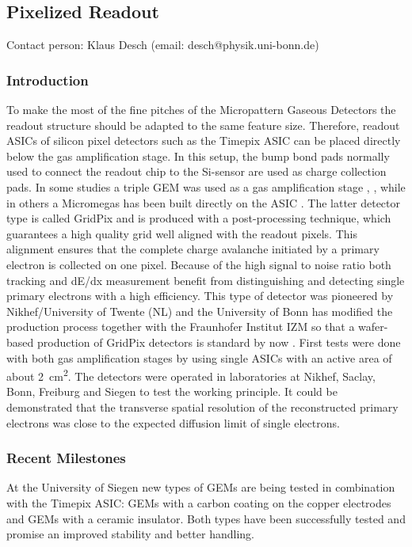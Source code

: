 \subsection{Pixelized Readout}\label{chap:TPC_sec:pixels}
Contact person: Klaus Desch (email: desch@physik.uni-bonn.de)\\

\subsubsection{Introduction}
To make the most of the fine pitches of the Micropattern Gaseous Detectors the
readout structure should be adapted to the same feature size. Therefore,
readout ASICs of silicon pixel detectors such as the Timepix ASIC
\cite{TPC_pixel_Timepix} can be placed directly below the gas amplification
stage. In this setup, the bump bond pads normally used to connect the readout
chip to the Si-sensor are used as charge collection pads. In some studies a
triple GEM was used as a gas amplification stage \cite{TPC_pixel_GEM_TP_1},
\cite{TPC_pixel_GEM_TP_2}, while in others a Micromegas has been built
directly on the ASIC \cite{TPC_pixel_InGrid}. The latter detector type is
 called GridPix and is produced with a post-processing technique, which
 guarantees a high quality grid well aligned with the readout pixels. This
 alignment ensures that the complete charge avalanche initiated by a primary
 electron is collected on one pixel. Because of the high signal to noise
 ratio both tracking and dE/dx measurement benefit from distinguishing and
 detecting single primary electrons with a high efficiency. This type of
 detector was pioneered by Nikhef/University of Twente (NL) and the University
 of Bonn has modified the
 production process together with the Fraunhofer Institut IZM so that a
 wafer-based production of GridPix detectors is standard by now
 \cite{TPC_pixel_InGrid_prod}. First tests were done with both
 gas amplification stages by using single ASICs with an active area of about \SI{2}{\centi\meter\squared}. The detectors were operated in laboratories at Nikhef, Saclay, Bonn,
 Freiburg and Siegen to test the working principle. It could be demonstrated
 that the transverse spatial resolution of the reconstructed primary electrons
 was close to the expected diffusion limit of single electrons.


\subsubsection{Recent Milestones}
At the University of Siegen new types of GEMs are being tested in combination
with the Timepix ASIC: GEMs with a
carbon coating on the copper electrodes and GEMs with a ceramic
insulator. Both types have been successfully tested and promise an improved
stability and better handling.

